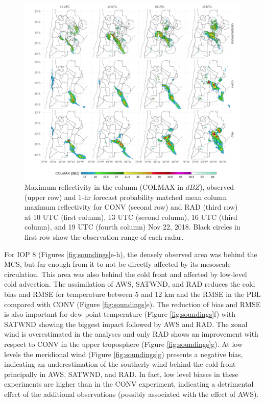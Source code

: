 \documentclass[authoryear,preprint,review,12pt]{elsarticle} %
\begin{document}
\begin{figure}[h]
\includegraphics[width=1\linewidth]{../figures/dbz-mean-1} \caption{Maximum reflectivity in the column (COLMAX in \(dBZ\)), observed (upper row) and 1-hr forecast probability matched mean column maximum reflectivity for CONV (second row) and RAD (third row) at 10 UTC (first column), 13 UTC (second column), 16 UTC (third column), and 19 UTC (fourth column) Nov 22, 2018. Black circles in first row show the observation range of each radar.}\label{fig:dbz-mean}
\end{figure}

For IOP 8 (Figures \ref{fig:soundings}e-h), the densely observed area was behind the MCS, but far enough from it to not be directly affected by its mesoscale circulation. This area was also behind the cold front and affected by low-level cold advection. The assimilation of AWS, SATWND, and RAD reduces the cold bias and RMSE for temperature between 5 and 12 km and the RMSE in the PBL compared with CONV (Figure \ref{fig:soundings}e). The reduction of bias and RMSE is also important for dew point temperature (Figure \ref{fig:soundings}f) with SATWND showing the biggest impact followed by AWS and RAD. The zonal wind is overestimated in the analyses and only RAD shows an improvement with respect to CONV in the upper troposphere (Figure \ref{fig:soundings}g). At low levels the meridional wind (Figure \ref{fig:soundings}g) presents a negative bias, indicating an underestimation of the southerly wind behind the cold front principally in AWS, SATWND, and RAD. In fact, low level biases in these experiments are higher than in the CONV experiment, indicating a detrimental effect of the additional observations (possibly associated with the effect of AWS).
\end{document}
